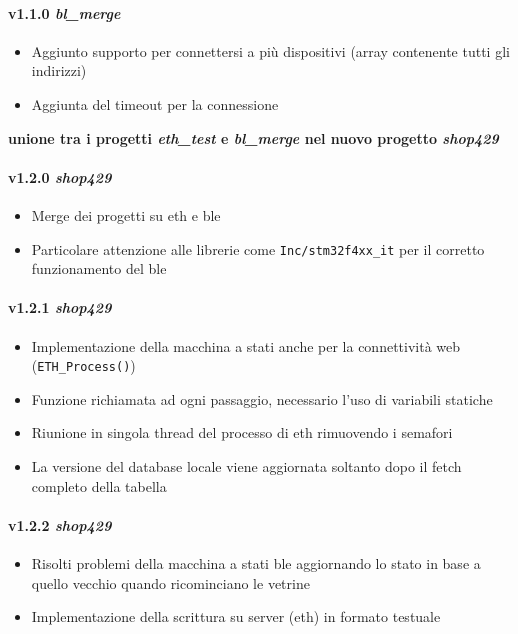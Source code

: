\paragraph{v1.1.0 \textit{bl\_merge}}
	\begin{itemize}
		\item Aggiunto supporto per connettersi a pi\`{u} dispositivi (array contenente tutti gli indirizzi)
		\item Aggiunta del timeout per la connessione
	\end{itemize}

\textbf{unione tra i progetti \textit{eth\_test} e \textit{bl\_merge} nel nuovo progetto \textit{shop429}}

\paragraph{v1.2.0 \textit{shop429}}
	\begin{itemize}
		\item Merge dei progetti su eth e ble
		\item Particolare attenzione alle librerie come \texttt{Inc/stm32f4xx\_it} per il corretto funzionamento del ble
	\end{itemize}
\paragraph{v1.2.1 \textit{shop429}}
	\begin{itemize}
		\item Implementazione della macchina a stati anche per la connettivit\`{a} web (\texttt{ETH\_Process()})
		\item Funzione richiamata ad ogni passaggio, necessario l'uso di variabili statiche
		\item Riunione in singola thread del processo di eth rimuovendo i semafori
		\item La versione del database locale viene aggiornata soltanto dopo il fetch completo della tabella
	\end{itemize}
\paragraph{v1.2.2 \textit{shop429}}
	\begin{itemize}
		\item Risolti problemi della macchina a stati ble aggiornando lo stato in base a quello vecchio quando ricominciano le vetrine
		\item Implementazione della scrittura su server (eth) in formato testuale
	\end{itemize}
